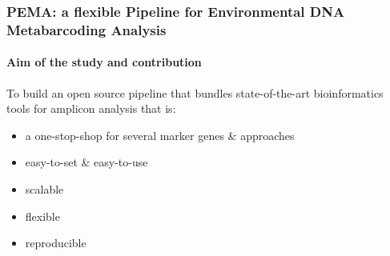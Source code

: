 \documentclass{beamer}
\begin{document}
   \begin{darkframes}
      \begin{frame}
         \frametitle{PEMA: a flexible Pipeline for Environmental DNA Metabarcoding Analysis}
         \framesubtitle{Aim of the study and contribution}




         \bigskip

         To build an open source
         pipeline that bundles state-of-the-art bioinformatics tools for
         amplicon analysis that is:
         \begin{itemize}
            \item a one-stop-shop for several marker genes \& approaches
            \item easy-to-set \& easy-to-use 
            \item scalable
            \item flexible
            \item reproducible
         \end{itemize}

      \end{frame}

   \end{darkframes}
\end{document}
